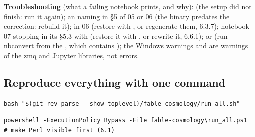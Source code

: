 \textbf{Troubleshooting} (what a failing notebook prints, and why):  (the setup did not finish: run it again); an  naming  in \S{}5 of 05 or 06 (the binary predates the  correction: rebuild it);  in 06 (restore  with , or regenerate them, 6.3.7); notebook 07 stopping in its \S{}5.3 with  (restore it with , or rewrite it, 6.6.1);  or  (run nbconvert from the , which contains ); the Windows warnings  and  are warnings of the zmq and Jupyter libraries, not errors.

\subsection{Reproduce everything with one command}
\label{sec:6.8}

\begin{Verbatim}
bash "$(git rev-parse --show-toplevel)/fable-cosmology/run_all.sh"
\end{Verbatim}

\begin{Verbatim}
powershell -ExecutionPolicy Bypass -File fable-cosmology\run_all.ps1     # make Perl visible first (6.1)
\end{Verbatim}

